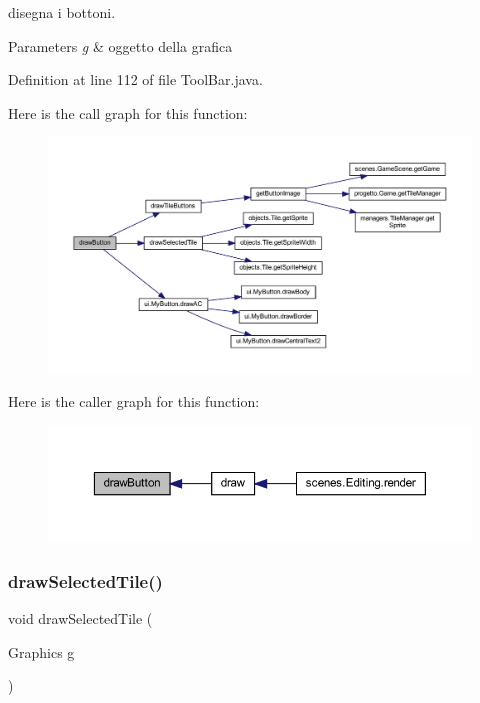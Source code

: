 disegna i bottoni. 


\begin{DoxyParams}{Parameters}
{\em g} & oggetto della grafica \\
\hline
\end{DoxyParams}


Definition at line 112 of file Tool\+Bar.\+java.

Here is the call graph for this function\+:\nopagebreak
\begin{figure}[H]
\begin{center}
\leavevmode
\includegraphics[width=350pt]{classui_1_1_tool_bar_a65768678909bc0512c6cb9780709ad38_cgraph}
\end{center}
\end{figure}
Here is the caller graph for this function\+:\nopagebreak
\begin{figure}[H]
\begin{center}
\leavevmode
\includegraphics[width=350pt]{classui_1_1_tool_bar_a65768678909bc0512c6cb9780709ad38_icgraph}
\end{center}
\end{figure}
\mbox{\label{classui_1_1_tool_bar_aa0f35d91a41dfb53af7bdd7d4a76916f}} 
\subsubsection{\texorpdfstring{draw\+Selected\+Tile()}{drawSelectedTile()}}
{\footnotesize\ttfamily void draw\+Selected\+Tile (\begin{DoxyParamCaption}\item[{Graphics}]{g }\end{DoxyParamCaption})}



